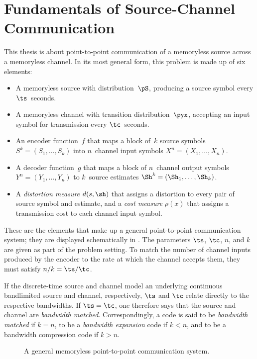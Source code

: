 \chapter{Fundamentals of Source-Channel Communication}\label{ch:fundamentals}

This thesis is about point-to-point communication of a memoryless source across
a memoryless channel. In its most general form, this problem is made up of six
elements:
\begin{itemize}
  \item A memoryless source with distribution~$\pS$, producing a source symbol
    every $\ts$~seconds.
  \item A memoryless channel with transition distribution~$\pyx$, accepting an
    input symbol for transmission every $\tc$~seconds.
  \item An encoder function~$f$ that maps a block of~$k$ source symbols $S^k
    = (S_1, \dots, S_k)$ into $n$~channel input symbols $X^n = (X_1,
    \dots, X_n)$.
  \item A decoder function~$g$ that maps a block of $n$~channel output symbols
    $Y^n = (Y_1, \dots, Y_n)$ to $k$~source estimates $\Sh^k = (\Sh_1,
    \dots, \Sh_k)$.
  \item A \emph{distortion measure} $d(s,\sh)$ that assigns a distortion to
    every pair of source symbol and estimate, and a \emph{cost measure}
    $\rho(x)$ that assigns a transmission cost to each channel input symbol. 
\end{itemize}
These are the elements that make up a general point-to-point communication
system;  they are displayed schematically in . The parameters
$\ts$, $\tc$, $n$, and $k$ are given as part of the problem setting. To match
the number of channel inputs produced by the encoder to the rate at which the
channel accepts them, they must satisfy $n/k = \ts / \tc$. 

If the discrete-time source and channel model an underlying continuous
bandlimited source and channel, respectively, $\ts$ and $\tc$ relate directly to
the respective bandwidths. If $\ts = \tc$, one therefore says that the source
and channel are \emph{bandwidth matched}. Correspondingly, a code is said to be
\emph{bandwidth matched} if $k=n$, to be a \emph{bandwidth expansion} code if $k
< n$, and to be a bandwidth compression code if $k > n$.

\begin{figure}
  \begin{center}
    
  \end{center}
  \caption{A general memoryless point-to-point communication system.}
  \label{fig:scgen}
\end{figure}

